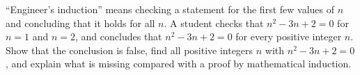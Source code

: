 ``Engineer's induction'' means checking a statement for the first few values of $n$ and concluding that it holds for all $n$. A student checks that $n^2-3n+2=0$ for $n=1$ and $n=2$, and concludes that $n^2-3n+2=0$ for every positive integer $n$. Show that the conclusion is false, find all positive integers $n$ with $n^2-3n+2=0$, and explain what is missing compared with a proof by mathematical induction.
